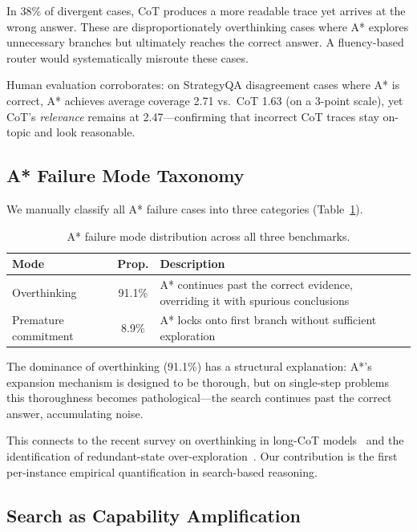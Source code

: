 \documentclass[11pt]{article}
\begin{document}
In 38\% of divergent cases, CoT produces a more readable trace yet arrives at the wrong answer. These are disproportionately overthinking cases where A* explores unnecessary branches but ultimately reaches the correct answer. A fluency-based router would systematically misroute these cases.

Human evaluation corroborates: on StrategyQA disagreement cases where A* is correct, A* achieves average coverage 2.71 vs.\ CoT 1.63 (on a 3-point scale), yet CoT's \emph{relevance} remains at 2.47---confirming that incorrect CoT traces stay on-topic and look reasonable.

\subsection{A* Failure Mode Taxonomy}
\label{sec:failure}

We manually classify all A* failure cases into three categories (Table~\ref{tab:failure}).

\begin{table}[t]
\centering
\caption{A* failure mode distribution across all three benchmarks.}
\label{tab:failure}
\small
\begin{tabular}{@{}lcp{7cm}@{}}
\toprule
\textbf{Mode} & \textbf{Prop.} & \textbf{Description} \\
\midrule
Overthinking & 91.1\% & A* continues past the correct evidence, overriding it with spurious conclusions \\
Premature commitment & 8.9\% & A* locks onto first branch without sufficient exploration \\
\bottomrule
\end{tabular}
\end{table}

The dominance of overthinking (91.1\%) has a structural explanation: A*'s expansion mechanism is designed to be thorough, but on single-step problems this thoroughness becomes pathological---the search continues past the correct answer, accumulating noise.

This connects to the recent survey on overthinking in long-CoT models~\citep{zhang2025survey} and the identification of redundant-state over-exploration~\citep{zhang2025streamlined}. Our contribution is the first per-instance empirical quantification in search-based reasoning.

\subsection{Search as Capability Amplification}
\label{sec:slm}
\end{document}
